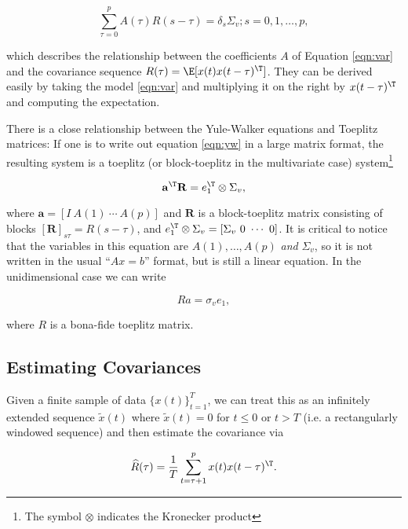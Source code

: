 \documentclass[12pt]{article}
\begin{document}
\begin{equation}
  \label{eqn:yw}
  \sum_{\tau = 0}^p A(\tau) R(s - \tau) = \delta_s \Sigma_v; s = 0, 1, \ldots, p,
\end{equation}

which describes the relationship between the coefficients $A$ of
Equation \eqref{eqn:var} and the covariance sequence
$R(\tau) = \E[x(t)x(t - \tau)^\T]$.  They can be derived easily by
taking the model \eqref{eqn:var} and multiplying it on the right by
$x(t - \tau)^\T$ and computing the expectation.

There is a close relationship between the Yule-Walker equations and
Toeplitz matrices: If one is to write out equation \ref{eqn:yw} in a
large matrix format, the resulting system is a toeplitz (or
block-toeplitz in the multivariate case) system\footnote{The symbol
  $\otimes$ indicates the Kronecker product}

\begin{equation}
  \mathbf{a}^\T \mathbf{R} = e_1^\T \otimes \Sigma_v,
\end{equation}

where $\mathbf{a} = [I\ A(1)\ \cdots\ A(p)]$ and $\mathbf{R}$ is a
block-toeplitz matrix consisting of blocks
$[\mathbf{R}]_{s\tau} = R(s - \tau)$, and
$e_1^\T \otimes \Sigma_v = [\Sigma_v\ 0\ \cdots\ 0]$.  It is critical
to notice that the variables in this equation are $A(1), \ldots, A(p)$
\textit{and} $\Sigma_v$, so it is not written in the usual
``$Ax = b$'' format, but is still a linear equation.  In the
unidimensional case we can write

\begin{equation}
  Ra = \sigma_v e_1,
\end{equation}

where $R$ is a bona-fide toeplitz matrix.

\subsection{Estimating Covariances}
Given a finite sample of data $\{x(t)\}_{t = 1}^T$, we can treat this
as an infinitely extended sequence $\widetilde{x}(t)$ where
$\widetilde{x}(t) = 0$ for $t \le 0$ or $t > T$ (i.e. a rectangularly
windowed sequence) and then estimate the covariance via

\begin{equation}
  \widehat{R}(\tau) = \frac{1}{T}\sum_{t = \tau + 1}^px(t)x(t - \tau)^\T.
\end{equation}
\end{document}
